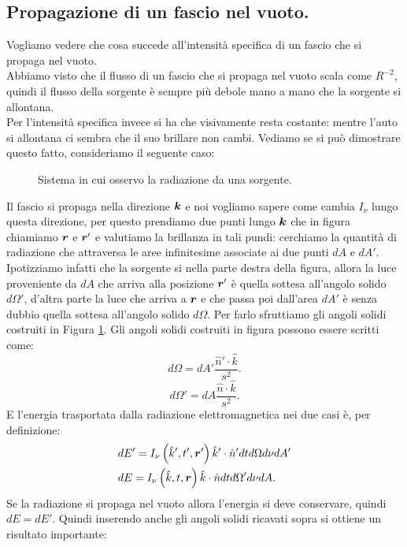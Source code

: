 \subsection{Propagazione di un fascio nel vuoto.}%
Vogliamo vedere che cosa succede all'intensità specifica di un fascio che si propaga nel vuoto.\\
Abbiamo visto che il flusso di un fascio che si propaga nel vuoto scala come $R^{-2}$, quindi il flusso della sorgente è sempre più debole mano a mano che la sorgente si allontana.\\ 
Per l'intensità specifica invece si ha che visivamente resta costante: mentre l'auto si allontana ci sembra che il suo brillare non cambi. Vediamo se si può dimostrare questo fatto, consideriamo il seguente caso:
\begin{figure}[H]
    \centering
    \caption{\scriptsize Sistema in cui osservo la radiazione da una sorgente.}
    \label{fig:brillanza-costante}
\end{figure}
\noindent
Il fascio si propaga nella direzione $\boldsymbol{k}$ e noi vogliamo sapere come cambia $I_{\nu}$ lungo questa direzione, per questo prendiamo due punti lungo $\boldsymbol{k}$ che in figura chiamiamo $\boldsymbol{r}$ e $\boldsymbol{r}'$ e valutiamo la brillanza in tali pundi: cerchiamo la quantità di radiazione che attraversa le aree infinitesime associate ai due punti $dA$ e $dA'$.
Ipotizziamo infatti che la sorgente si nella parte destra della figura, allora la luce proveniente da $dA$ che arriva alla posizione $\boldsymbol{r}'$ è quella sottesa all'angolo solido $d\Omega'$, d'altra parte la luce che arriva a $\boldsymbol{r}$ e che passa poi dall'area $dA'$ è senza dubbio quella sottesa all'angolo solido $d\Omega$.
Per farlo sfruttiamo gli angoli solidi costruiti in Figura \ref{fig:brillanza-costante}. Gli angoli solidi costruiti in figura possono essere scritti come:
\[
	d\Omega = dA' \frac{\hat{n}'\cdot \hat{k}}{s^2}
.\] 
\[
	d\Omega' = dA \frac{\hat{n}\cdot \hat{k}}{s^2}
.\] 
E l'energia trasportata dalla radiazione elettromagnetica nei due casi è, per definizione:
\begin{align*}
	&dE' = I_{\nu}\left( \hat{k}', t', \boldsymbol{r}' \right) \hat{k}'\cdot \hat{n}' dt d\Omega d\nu dA'\\
	&dE = I_{\nu}\left( \hat{k}, t, \boldsymbol{r}\right) \hat{k}\cdot \hat{n} dt d\Omega' d\nu dA
.\end{align*}
Se la radiazione si propaga nel vuoto allora l'energia si deve conservare, quindi $dE = dE'$. Quindi inserendo anche gli angoli solidi ricavati sopra si ottiene un risultato importante:
